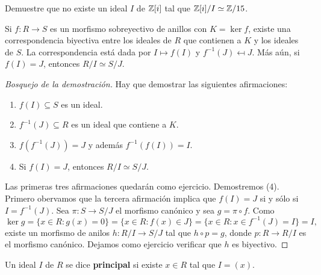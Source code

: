 \begin{exercise}
Demuestre que no existe un ideal $I$ de $\mathbb{Z}[i]$ tal que $\mathbb{Z}[i]/I\simeq\mathbb{Z}/15$.
\end{exercise}



%

\begin{theorem}
Si $f\colon R\to S$ es un morfismo sobreyectivo de anillos con $K=\ker f$, existe una correspondencia biyectiva entre los ideales de $R$ que contienen a $K$ y los ideales de $S$. 
La correspondencia está dada por $I\mapsto f(I)$ y $f^{-1}(J)\mapsfrom J$. Más aún, si 
$f(I)=J$, entonces $R/I\simeq S/J$.  
\end{theorem}

\begin{proof}[Bosquejo de la demostración]
Hay que demostrar las siguientes afirmaciones:
\begin{enumerate}
\item $f(I)\subseteq S$ es un ideal.
\item $f^{-1}(J)\subseteq R$ es un ideal que contiene a $K$.
\item $f(f^{-1}(J))=J$ y además $f^{-1}(f(I))=I$.
\item Si $f(I)=J$, entonces $R/I\simeq S/J$.	
\end{enumerate}
Las primeras tres afirmaciones quedarán como ejercicio. 
Demostremos (4). Primero obervamos que la tercera afirmación implica que
$f(I)=J$ si y sólo si $I=f^{-1}(J)$. Sea $\pi\colon S\to S/J$ 
el morfismo canónico y sea 
$g=\pi\circ f$. Como
\[
\ker g=\{x\in R:g(x)=0\}=\{x\in R:f(x)\in J\}=\{x\in R:x\in f^{-1}(J)=I\}=I,
\]
existe un morfismo de anilos $h\colon R/I\to S/J$ tal que $h\circ p=g$, donde $p\colon R\to R/I$ es el morfismo canónico. Dejamos como ejercicio verificar que $h$ es biyectivo.
\end{proof}


\begin{definition}
Un ideal $I$ de $R$ se dice \textbf{principal} si existe $x\in R$ tal que $I=(x)$. 
\end{definition}

